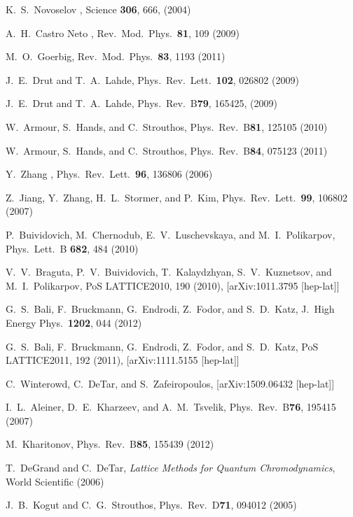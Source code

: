 \documentclass[aps,prd,twocolumn,showpacs,superscriptaddress,groupedaddress]{revtex4}  %
\begin{document}
\begin{thebibliography}{99}

K.~S.~Novoselov \etal, Science {\bf 306}, 666, (2004)

A.~H.~Castro Neto \etal, Rev.\ Mod.\ Phys.\ {\bf 81}, 109 (2009)

M.~O.~Goerbig, Rev.\ Mod.\ Phys.\ {\bf 83}, 1193  (2011)

J.~E.~Drut and T.~A.~Lahde, Phys.\ Rev.\ Lett.\ {\bf 102}, 026802 (2009)

J.~E.~Drut and T.~A.~Lahde, Phys.\ Rev.\ B{\bf79}, 165425, (2009)

W.~Armour, S.~Hands, and C.~Strouthos, Phys.\ Rev.\ B{\bf 81}, 125105 (2010)

W.~Armour, S.~Hands, and C.~Strouthos, Phys.\ Rev.\ B{\bf 84}, 075123 (2011)

Y.~Zhang \etal, Phys.\ Rev.\ Lett.\ {\bf 96}, 136806 (2006)

Z.~Jiang, Y.~Zhang, H.~L.~Stormer, and P.~Kim, Phys.\ Rev.\ Lett.\ {\bf 99}, 106802 (2007)

P.~Buividovich, M.~Chernodub, E.~V.~Luschevskaya, and M.~I.~Polikarpov, Phys.\ Lett.\ B {\bf 682}, 484 (2010)

V.~V.~Braguta, P.~V.~Buividovich, T.~Kalaydzhyan, S.~V.~Kuznetsov, and M.~I.~Polikarpov, PoS LATTICE2010, 190 (2010), [arXiv:1011.3795 [hep-lat]]

G.~S.~Bali, F.~Bruckmann, G.~Endrodi, Z.~Fodor, and S.~D.~Katz, J.\ High Energy Phys.\ {\bf 1202}, 044 (2012)

G.~S.~Bali, F.~Bruckmann, G.~Endrodi, Z.~Fodor, and S.~D.~Katz, PoS LATTICE2011, 192 (2011), [arXiv:1111.5155 [hep-lat]]

C.~Winterowd, C.~DeTar, and S.~Zafeiropoulos, [arXiv:1509.06432 [hep-lat]]

I.~L.~Aleiner, D.~E.~Kharzeev, and A.~M.~Tsvelik, Phys.\ Rev.\ B{\bf 76}, 195415 (2007)

M.~Kharitonov, Phys.\ Rev.\ B{\bf 85}, 155439 (2012)

T.~DeGrand and C.~DeTar, {\it Lattice Methods for Quantum Chromodynamics}, World Scientific (2006)

J.~B.~Kogut and C.~G.~Strouthos, Phys.\ Rev.\ D{\bf 71}, 094012 (2005)


\end{thebibliography}
\end{document}
